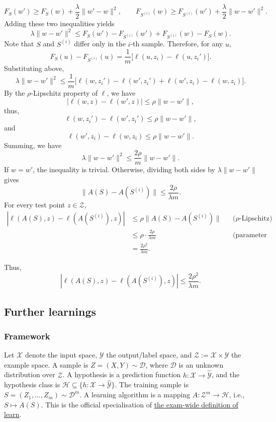 \documentclass[11pt,a4paper]{article}
\newcommand{\jump}[2]{\hyperref[#1]{#2}}
\theoremstyle{definition}
\begin{document}
\[
F_S(w') \geq F_S(w) + \frac{\lambda}{2}\|w' - w\|^2, \qquad F_{S^{(i)}}(w) \geq F_{S^{(i)}}(w') + \frac{\lambda}{2}\|w - w'\|^2.
\]
Adding these two inequalities yields
\[
\lambda \|w - w'\|^2 \leq F_S(w') - F_{S^{(i)}}(w') + F_{S^{(i)}}(w) - F_S(w).
\]
Note that $S$ and $S^{(i)}$ differ only in the $i$-th sample. Therefore, for any $u$,
\[
F_S(u) - F_{S^{(i)}}(u) = \frac{1}{m}\bigl[\ell(u, z_i) - \ell(u, z_i')\bigr].
\]
Substituting above,
\[
\lambda \|w - w'\|^2 \leq \frac{1}{m} \bigl[\ell(w, z_i') - \ell(w', z_i') + \ell(w', z_i) - \ell(w, z_i)\bigr].
\]
By the $\rho$-Lipschitz property of $\ell$, we have
\[
|\ell(w, z) - \ell(w', z)| \leq \rho \|w - w'\|,
\]
thus,
\[
\ell(w, z_i') - \ell(w', z_i') \leq \rho \|w - w'\|,
\]
and
\[
\ell(w', z_i) - \ell(w, z_i) \leq \rho \|w - w'\|.
\]
Summing, we have
\[
\lambda \|w - w'\|^2 \leq \frac{2\rho}{m} \|w - w'\|.
\]
If $w = w'$, the inequality is trivial. Otherwise, dividing both sides by $\lambda \|w - w'\|$ gives
\[
\|A(S) - A(S^{(i)})\| \leq \frac{2\rho}{\lambda m}.
\]
For every test point $z \in \mathcal{Z}$,
\begin{align*}
|\ell(A(S), z) - \ell(A(S^{(i)}), z)|
  &\leq \rho \|A(S) - A(S^{(i)})\|
  && \text{($\rho$-Lipschitz)} \\
  &\leq \rho \cdot \frac{2\rho}{\lambda m}
  && \text{(parameter stability)} \\
  &= \frac{2\rho^2}{\lambda m}.
\end{align*}

Thus,
\begin{equation}
|\ell(A(S), z) - \ell(A(S^{(i)}), z)| \leq \frac{2\rho^2}{\lambda m}. \tag{13}\label{eq:loss-stability}
\end{equation}

\subsection{Further learnings}

\subsubsection{Framework}\label{sec:spr2025-a-framework}

Let $\mathcal{X}$ denote the input space, $\mathcal{Y}$ the output/label space, and $\mathcal{Z} := \mathcal{X} \times \mathcal{Y}$ the example space. A sample is $Z = (X, Y) \sim \mathcal{D}$, where $\mathcal{D}$ is an unknown distribution over $\mathcal{Z}$. A hypothesis is a prediction function $h : \mathcal{X} \to \widehat{\mathcal{Y}}$, and the hypothesis class is $\mathcal{H} \subseteq \{h : \mathcal{X} \to \widehat{\mathcal{Y}}\}$. The training sample is $S = (Z_1, \dots, Z_m) \sim \mathcal{D}^m$. A learning algorithm is a mapping $A : \mathcal{Z}^m \to \mathcal{H}$, i.e., $S \mapsto A(S)$. This is the official specialisation of \jump{def:spr2025-learn}{the exam-wide definition of learn}.
\end{document}
